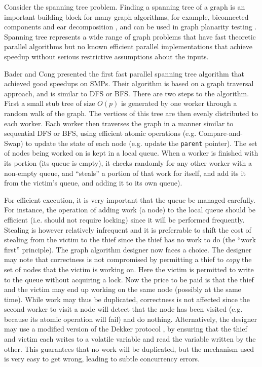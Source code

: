 Consider the spanning tree problem. Finding a spanning tree of a graph
is an important building block for many graph algorithms, for example,
biconnected components and ear decomposition \cite{MR86}, and can be
used in graph planarity testing \cite{KR88}.  Spanning tree represents
a wide range of graph problems that have fast theoretic parallel
algorithms but no known efficient parallel implementations that
achieve speedup without serious restrictive assumptions about the
inputs.

Bader and Cong \cite{BC04a} presented the first fast parallel spanning
tree algorithm that achieved good speedups on SMPs. Their algorithm is
based on a graph traversal approach, and is similar to DFS or BFS.
There are two steps to the algorithm. First a small stub tree of size
$O(p)$ is generated by one worker through a random walk of the
graph. The vertices of this tree are then evenly distributed to each
worker.  Each worker then traverses the graph in a manner similar to
sequential DFS or BFS, using efficient atomic operations (e.g.{}
Compare-and-Swap) to update the state of each node (e.g.{} update the
{\tt parent} pointer). The set of nodes being worked on is kept in a
local queue.  When a worker is finished with its portion (its queue is
empty), it checks randomly for any other worker with a non-empty
queue, and ``steals'' a portion of that work for itself, and add its
it from the victim's queue, and adding it to its own queue).


For efficient execution, it is very important that the queue be
managed carefully. For instance, the operation of adding work (a node)
to the local queue should be efficient (i.e.{} should not require
locking) since it will be performed frequently. Stealing is however
relatively infrequent and it is preferrable to shift the cost of
stealing from the victim to the thief since the thief has no work to
do (the ``work first'' principle). The graph algorithm designer now
faces a choice. The designer may note \cite{BC04a} that correctness is
not compromised by permitting a thief to {\em copy} the set of nodes
that the victim is working on. Here the victim is permitted to write
to the queue without acquiring a lock. Now the price to be paid is
that the thief and the victim may end up working on the same node
(possibly at the same time).  While work may thus be duplicated,
correctness is not affected since the second worker to visit a node
will detect that the node has been visited (e.g.{} because its atomic
operation will fail) and do nothing. Alternatively, the designer may
use a modified version of the Dekker protocol \cite{BJKLRZ95}, by ensuring
that the thief and victim each writes to a volatile variable and read
the variable written by the other. This guarantees that no work will
be duplicated, but the mechanism used is very easy to get wrong,
leading to subtle concurrency errors.

